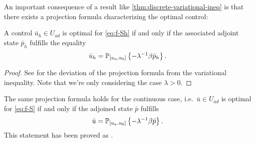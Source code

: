 \documentclass[../thesis.tex]{subfiles}
\begin{document}
An important consequence of a result like \cref{thm:discrete-variational-ineq} is that there exists a projection formula characterizing the optimal control:
\begin{theorem}
\label{thm:projection-formula}
A control $\bar{u}_h \in U_{ad}$ is optimal for \cref{eq:f-Sh} if and only if the associated adjoint state $\bar{p}_h$ fulfills the equality
\[
	\bar{u}_h = \mathbb{P}_{[u_a, u_b]} \left\{ - \lambda^{-1} \beta \bar{p}_h \right\}.
\]
\end{theorem}
\begin{proof}
See \cite[p.\ 53ff.]{Troeltzsch} for the deviation of the projection formula from the variational inequality.
Note that we're only considering the case $\lambda > 0$.
\end{proof}
The same projection formula holds for the continuous case, i.e.\ $\bar{u} \in U_{ad}$ is optimal for \cref{eq:f-S} if and only if the adjoined state $\bar{p}$ fulfills
\[
	\bar{u} = \mathbb{P}_{[u_a, u_b]} \left\{ - \lambda^{-1} \beta \bar{p} \right\}.
\]
This statement has been proved as \cite[Satz 3.20]{Troeltzsch}.
\end{document}
